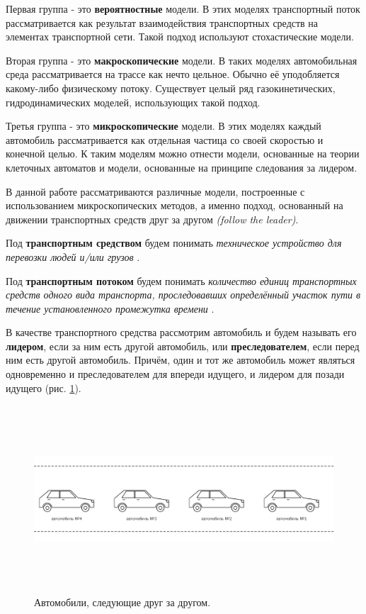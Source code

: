 \documentclass[12pt, a4paper]{extarticle}
\numberwithin{equation}{section}
\begin{document}
Первая группа - это \textbf{вероятностные} модели. В этих моделях транспортный поток рассматривается как результат взаимодействия транспортных средств на элементах транспортной сети.
Такой подход используют стохастические модели.

Вторая группа - это \textbf{макроскопические} модели. В таких моделях автомобильная среда рассматривается на трассе как нечто цельное. Обычно её уподобляется какому-либо физическому потоку. Существует целый ряд газокинетических, гидродинамических моделей, использующих такой подход.

Третья группа - это \textbf{микроскопические} модели. В этих моделях каждый автомобиль рассматривается как отдельная частица со своей скоростью и конечной целью. К таким моделям можно отнести модели, основанные на теории клеточных автоматов и модели, основанные на принципе следования за лидером.

В данной работе рассматриваются различные модели, построенные с использованием микроскопических методов, а именно подход, основанный на движении транспортных средств друг за другом {\it(follow the leader)}.

Под \textbf{транспортным средством} будем понимать {\it техническое устройство для перевозки людей и/или грузов} \cite{TrafficFlow}.

Под \textbf{транспортным потоком} будем понимать {\it количество единиц транспортных средств одного вида транспорта, проследовавших определённый участок пути в течение установленного промежутка времени} \cite{TrafficFlow}.

В качестве транспортного средства рассмотрим автомобиль и будем называть его \textbf{лидером}, если за ним есть другой автомобиль, или \textbf{преследователем}, если перед ним есть другой автомобиль. Причём, один и тот же автомобиль может являться одновременно и преследователем для впереди идущего, и лидером для позади идущего (рис. \ref{car_following}). 

\begin{figure}[h!]  
	\begin{center}
		\includegraphics[keepaspectratio,width=160mm,height=70mm]{Images/car_following.png}
	\end{center}
	\caption{Автомобили, следующие друг за другом.}
	\label{car_following}
\end{figure}
\end{document}
